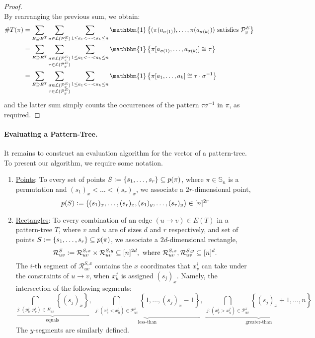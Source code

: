 \documentclass{article}
\newcommand{\Sn}{\mathbb{S}_n}
\newcommand{\eqdef}{\vcentcolon=}
\theoremstyle{remark}
\theoremstyle{plain}
\begin{document}
\begin{proof}
\ \\ \noindent By rearranging the previous sum, we obtain: 
\begin{align*}
    \#T(\pi) &= \sum_{E\supseteq E^{T}}\sum_{\sigma\in\mathcal{L}(\mathcal{P}_{x}^{E})}\sum_{1 \le a_1 < \dots < a_{k} \le n}\mathbbm{1} \left\{ (\pi(a_{\sigma(1)}),\ldots,\pi(a_{\sigma(k)})) \text{ satisfies } \mathcal{P}_{y}^{E} \right\} \\
    &= \sum_{E\supseteq E^{T}}\sum_{\substack{\sigma\in\mathcal{L}(\mathcal{P}_{x}^{E}) \\ \tau  \in \mathcal{L}(\mathcal{P}_{y}^{E})}}\sum_{1 \le a_1 < \dots < a_{k} \le n}\mathbbm{1} \left\{ \pi[a_{\sigma(1)},\ldots,a_{\sigma(k)}] \cong \tau \right\} \\
    &= \sum_{E\supseteq E^{T}}\sum_{\substack{\sigma\in\mathcal{L}(\mathcal{P}_{x}^{E}) \\ \tau  \in \mathcal{L}(\mathcal{P}_{y}^{E})}}\sum_{1 \le a_1 < \dots < a_{k} \le n}\mathbbm{1} \left\{ \pi[a_{1},\ldots,a_{k}] \cong \tau \cdot \sigma^{-1} \right\}
\end{align*}
and the latter sum simply counts the occurrences of the pattern $\tau \sigma^{-1}$ in $\pi$, as required.
\end{proof}

\paragraph{Evaluating a Pattern-Tree.} It remains to construct an evaluation algorithm for the vector of a pattern-tree.
To present our algorithm, we require some notation.
\begin{enumerate}
    \item \underline{Points}: To every set of points $S \eqdef \{ s_1, \dots, s_r \} \subseteq p(\pi)$,
    where $\pi \in \Sn$ is a permutation and $(s_1)_x < \dots < (s_r)_x$,
    we associate a $2r$-dimensional point,
    \[
        p(S) \eqdef \big( (s_1)_x, \dots, (s_r)_x, (s_1)_y, \dots, (s_r)_y \big) \in [n]^{2r}
    \]

    \item \underline{Rectangles}: To every combination of an edge $(u \to v) \in E(T)$ in a pattern-tree $T$,
where $v$ and $u$ are of sizes $d$ and $r$ respectively,
and set of points $S \eqdef \{ s_1, \dots, s_r \} \subseteq p(\pi)$, 
we associate a $2d$-dimensional rectangle,
\[
    \mathcal{R}_{uv}^S \eqdef \mathcal{R}_{uv}^{S,x} \times \mathcal{R}_{uv}^{S,y} \subseteq [n]^{2d},
    \text{ where } \mathcal{R}_{uv}^{S,x}, \mathcal{R}_{uv}^{S,y} \subseteq [n]^d.
\]
The $i$-th segment of $\mathcal{R}_{uv}^{S,x}$ contains the $x$ coordinates that $x_v^i$ can take under the constraints of $u\to v$, when $x_u^j$ is assigned $(s_j)_x$. Namely, the intersection of the following segments:
\[
    \underbrace{\bigcap_{j : (p_u^j, p_v^i) \in E_{uv}} \left\{ (s_j)_x \right\}}_{\text{equals}},\; \underbrace{\bigcap_{j: (x_v^i < x_u^j) \in \mathcal{P}_{uv}^x } \left\{1, \dots, (s_j)_x - 1\right\}}_{\text{less-than}},\; \underbrace{\bigcap_{j: (x_v^i > x_u^j) \in \mathcal{P}_{uv}^x } \left\{ (s_j)_x+1, \dots, n \right\}}_{\text{greater-than}}
\]
The $y$-segments are similarly defined.    
\end{enumerate}
\end{document}
